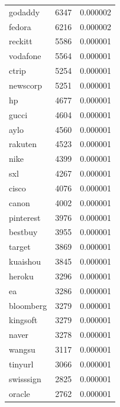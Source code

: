 \begin{tabular}{lrr}
godaddy & 6347 & 0.000002 \\
fedora & 6216 & 0.000002 \\
reckitt & 5586 & 0.000001 \\
vodafone & 5564 & 0.000001 \\
ctrip & 5254 & 0.000001 \\
newscorp & 5251 & 0.000001 \\
hp & 4677 & 0.000001 \\
gucci & 4604 & 0.000001 \\
aylo & 4560 & 0.000001 \\
rakuten & 4523 & 0.000001 \\
nike & 4399 & 0.000001 \\
sxl & 4267 & 0.000001 \\
cisco & 4076 & 0.000001 \\
canon & 4002 & 0.000001 \\
pinterest & 3976 & 0.000001 \\
bestbuy & 3955 & 0.000001 \\
target & 3869 & 0.000001 \\
kuaishou & 3845 & 0.000001 \\
heroku & 3296 & 0.000001 \\
ea & 3286 & 0.000001 \\
bloomberg & 3279 & 0.000001 \\
kingsoft & 3279 & 0.000001 \\
naver & 3278 & 0.000001 \\
wangsu & 3117 & 0.000001 \\
tinyurl & 3066 & 0.000001 \\
swisssign & 2825 & 0.000001 \\
oracle & 2762 & 0.000001 \\
\bottomrule
\end{tabular}
